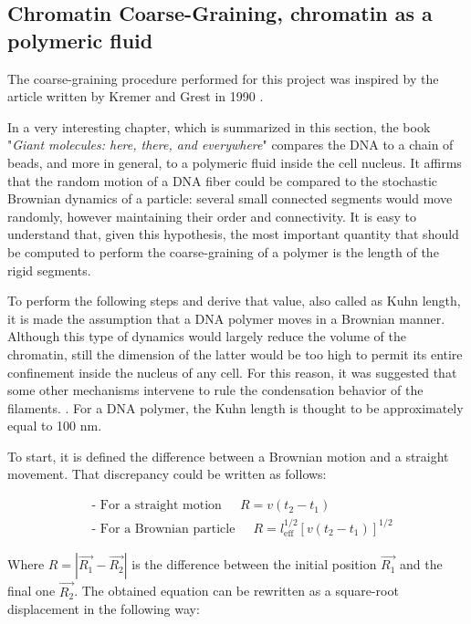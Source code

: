
\subsection{Chromatin Coarse-Graining, chromatin as a polymeric fluid}
The coarse-graining procedure performed for this project was inspired by the article written by Kremer and Grest in 1990
\cite{kremerDynamicsEntangledLinear1990a}.

In a very interesting chapter, which is summarized in this section, the book "\textit{Giant molecules: here, there, and everywhere}"
\cite{grosbergGiantMoleculesHere2011}
compares the DNA to a chain of beads, and more in general, to a polymeric fluid inside the cell nucleus. It affirms that the random motion of a DNA fiber could be compared to the stochastic Brownian dynamics of a particle: several small connected segments would move randomly, however maintaining their order and connectivity. It is easy to understand that, given this hypothesis, the most important quantity that should be computed to perform the coarse-graining of a polymer is the length of the rigid segments.

To perform the following steps and derive that value, also called as Kuhn length, it is made the assumption that a DNA polymer moves in a Brownian manner. Although this type of dynamics would largely reduce the volume of the chromatin, still the dimension of the latter would be too high to permit its entire confinement inside the nucleus of any cell. For this reason, it was suggested that some other mechanisms intervene to rule the condensation behavior of the filaments.
\cite{grosbergGiantMoleculesHere2011}. 
For a DNA polymer, the Kuhn length is thought to be approximately equal to 100 nm.

To start, it is defined the difference between a Brownian motion and a straight movement. That discrepancy could be written as follows:

\begin{align*}
    &\text{- For a straight motion } \;\;\;\; R = v(t_2 - t_1) \\ 
    &\text{- For a Brownian particle } \;\;\;\; R = l_{\text{eff}}^{1/2} [v (t_2 - t_1)]^{1/2} 
\end{align*}

Where $R = |\vec{R_1} - \vec{R_2}|$ is the difference between the initial position $\vec{R_1}$ and the final one $\vec{R_2}$. The obtained equation can be rewritten as a square-root displacement in the following way:

